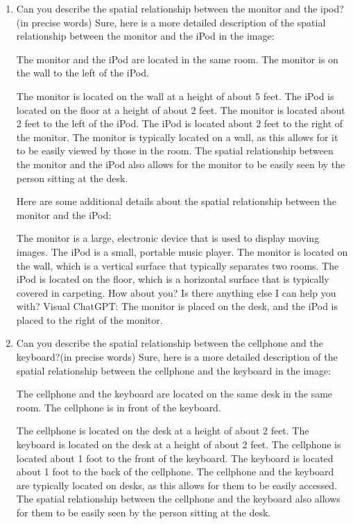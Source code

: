 \begin{enumerate}
    \item Can you describe the spatial relationship between the monitor and the ipod?(in precise words)
    \subitem Sure, here is a more detailed description of the spatial relationship between the monitor and the iPod in the image:

    The monitor and the iPod are located in the same room. The monitor is on the wall to the left of the iPod.
    
    The monitor is located on the wall at a height of about 5 feet.
    The iPod is located on the floor at a height of about 2 feet.
    The monitor is located about 2 feet to the left of the iPod.
    The iPod is located about 2 feet to the right of the monitor.
    The monitor is typically located on a wall, as this allows for it to be easily viewed by those in the room. The spatial relationship between the monitor and the iPod also allows for the monitor to be easily seen by the person sitting at the desk.
    
    Here are some additional details about the spatial relationship between the monitor and the iPod:
    
    The monitor is a large, electronic device that is used to display moving images.
    The iPod is a small, portable music player.
    The monitor is located on the wall, which is a vertical surface that typically separates two rooms.
    The iPod is located on the floor, which is a horizontal surface that is typically covered in carpeting.
    How about you? Is there anything else I can help you with?
    \subitem Visual ChatGPT: The monitor is placed on the desk, and the iPod is placed to the right of the monitor.
    \item Can you describe the spatial relationship between the cellphone and the keyboard?(in precise words)
    \subitem Sure, here is a more detailed description of the spatial relationship between the cellphone and the keyboard in the image:

    The cellphone and the keyboard are located on the same desk in the same room. The cellphone is in front of the keyboard.
    
    The cellphone is located on the desk at a height of about 2 feet.
    The keyboard is located on the desk at a height of about 2 feet.
    The cellphone is located about 1 foot to the front of the keyboard.
    The keyboard is located about 1 foot to the back of the cellphone.
    The cellphone and the keyboard are typically located on desks, as this allows for them to be easily accessed. The spatial relationship between the cellphone and the keyboard also allows for them to be easily seen by the person sitting at the desk.
    

\end{enumerate}
